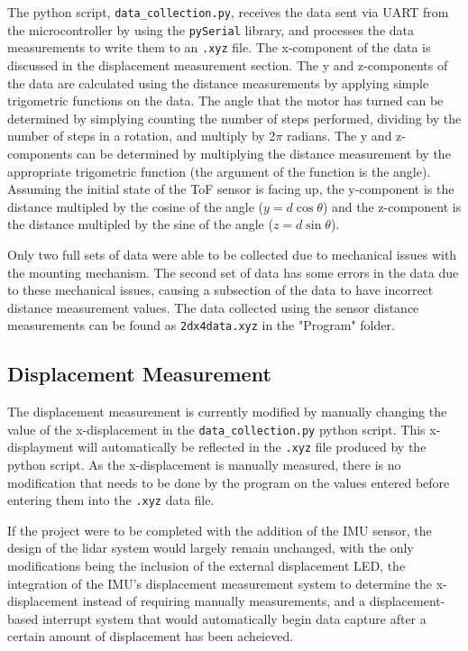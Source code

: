\documentclass[12pt]{article}
\begin{document}
The python script, \texttt{data\_collection.py}, receives the data sent via UART from the microcontroller by using the \texttt{pySerial} library, and processes the data measurements to write them to an \texttt{.xyz} file. The x-component of the data is discussed in the displacement measurement section. The y and z-components of the data are calculated using the distance measurements by applying simple trigometric functions on the data. The angle that the motor has turned can be determined by simplying counting the number of steps performed, dividing by the number of steps in a rotation, and multiply by 2$\pi$ radians. The y and z-components can be determined by multiplying the distance measurement by the appropriate trigometric function (the argument of the function is the angle). Assuming the initial state of the ToF sensor is facing up, the y-component is the distance multipled by the cosine of the angle ($y = d\cos{\theta}$) and the z-component is the distance multipled by the sine of the angle ($z = d\sin{\theta}$). 

Only two full sets of data were able to be collected due to mechanical issues with the mounting mechanism. The second set of data has some errors in the data due to these mechanical issues, causing a subsection of the data to have incorrect distance measurement values. The data collected using the sensor distance measurements can be found as \texttt{2dx4data.xyz} in the "Program" folder.
\subsection*{Displacement Measurement}
\indent \indent The displacement measurement is currently modified by manually changing the value of the x-displacement in the \texttt{data\_collection.py} python script. This x-displayment will automatically be reflected in the \texttt{.xyz} file produced by the python script. As the x-displacement is manually measured, there is no modification that needs to be done by the program on the values entered before entering them into the \texttt{.xyz} data file.

If the project were to be completed with the addition of the IMU sensor, the design of the lidar system would largely remain unchanged, with the only modifications being the inclusion of the external displacement LED, the integration of the IMU's displacement measurement system to determine the x-displacement instead of requiring manually measurements, and a displacement-based interrupt system that would automatically begin data capture after a certain amount of displacement has been acheieved.
\end{document}
